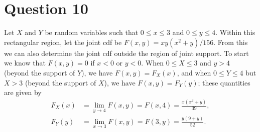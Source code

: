 \documentclass[10pt]{article}
\begin{document}
\section{Question 10} \noindent
Let \(X\) and \(Y\) be random variables such that \(0 \le x \le 3\) and \(0 \le y \le 4\). Within this rectangular region, let the joint cdf be 
\(F(x,y) = xy(x^2+y)/156\). From this we can also determine the joint cdf outside the region of joint support. To start we know that \(F(x,y) = 0\) if
\(x < 0\) or \(y < 0\). When \(0 \le X \le 3\) and \(y > 4\) (beyond the support of \(Y\)), we have \(F(x,y) = F_X(x)\), and when 
\(0 \le Y \le 4\) but \(X > 3\) (beyond the support of \(X\)), we have \(F(x,y) = F_Y(y)\); these quantities are given by 
\begin{align*}
    F_X(x) &= \lim_{y \to 4} F(x,y) = F(x,4) = \frac{x(x^2+y)}{39}, \\
    F_Y(y) &= \lim_{x \to 3} F(x,y) = F(3,y) = \frac{y(9 + y)}{52}.
\end{align*}
\end{document}

